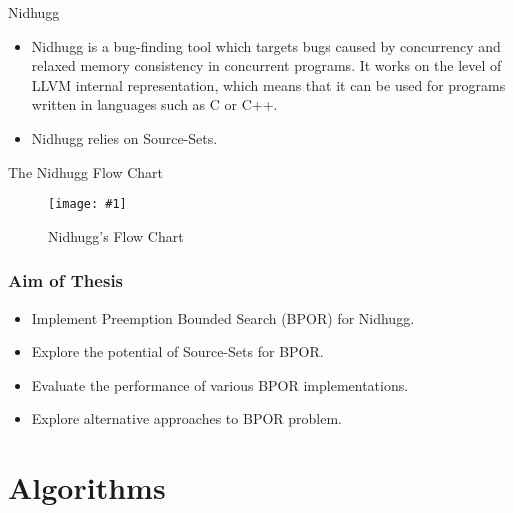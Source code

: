 \documentclass[9pt]{beamer}
\newcommand{\mediumGraph}[2]{
  \begin{figure}[H]
    \centering
    \texttt{[image: \#1]}
    \caption{#2}
    \label{#2}
    \end{figure}
    }
\begin{document}
\begin{frame}{Nidhugg}
    \begin{itemize}
        
\item Nidhugg is a bug-finding tool which targets bugs caused by concurrency
and relaxed memory consistency in concurrent programs. It works on the
level of LLVM internal representation, which means that it can be used
for programs written in languages such as C or C++.
\item Nidhugg relies on Source-Sets.
    \end{itemize}

\end{frame}


\begin{frame}{The Nidhugg Flow Chart}
    
\mediumGraph{../img/flowchartv2.pdf}{Nidhugg's Flow Chart}

\end{frame}

\begin{frame}
\frametitle{Aim of Thesis}
\begin{itemize}[<+->]
    \item Implement Preemption Bounded Search (BPOR) for Nidhugg. 
    \item Explore the potential of Source-Sets for BPOR.
    \item Evaluate the performance of various BPOR implementations.
    \item Explore alternative approaches to BPOR problem.
\end{itemize}

\end{frame}

\section{Algorithms}

\end{document}
